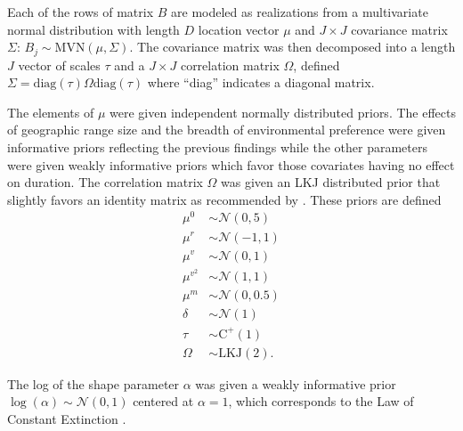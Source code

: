 \documentclass[11pt]{article}
\begin{document}
Each of the rows of matrix \(B\) are modeled as realizations from a multivariate normal distribution with length \(D\) location vector \(\mu\) and \(J \times J\) covariance matrix \(\Sigma\): \(B_{j} \sim \mathrm{MVN}(\mu, \Sigma)\). The covariance matrix was then decomposed into a length \(J\) vector of scales \(\tau\) and a \(J \times J\) correlation matrix \(\Omega\), defined \(\Sigma = \mathrm{diag}(\tau) \Omega \mathrm{diag}(\tau)\) where ``diag'' indicates a diagonal matrix.

The elements of \(\mu\) were given independent normally distributed priors. The effects of geographic range size  and the breadth of environmental preference were given informative priors reflecting the previous findings while the other parameters were given weakly informative priors which favor those covariates having no effect on duration. The correlation matrix \(\Omega\) was given an LKJ distributed prior \citep{Lewandowski2009} that slightly favors an identity matrix as recommended by \citet{StanManual}. These priors are defined
\begin{equation}
  \begin{aligned}
    \mu^{0} &\sim \mathcal{N}(0, 5) \\
    \mu^{r} &\sim \mathcal{N}(-1, 1) \\
    \mu^{v} &\sim \mathcal{N}(0, 1) \\
    \mu^{v^{2}} &\sim \mathcal{N}(1, 1) \\
    \mu^{m} &\sim \mathcal{N}(0, 0.5) \\
    \delta &\sim \mathcal{N}(1) \\
    \tau &\sim \mathrm{C^{+}}(1) \\
    \Omega &\sim \text{LKJ}(2).
  \end{aligned}
  \label{eq:sigma_prior}
\end{equation}

The log of the shape parameter \(\alpha\) was given a weakly informative prior \(\log(\alpha) \sim \mathcal{N}(0, 1)\) centered at \(\alpha = 1\), which corresponds to the Law of Constant Extinction \citep{VanValen1973}.
\end{document}
